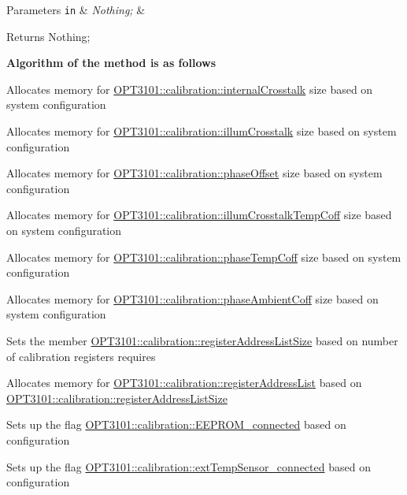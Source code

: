 \begin{DoxyParams}[1]{Parameters}
\mbox{\tt in}  & {\em Nothing;} & \\
\hline
\end{DoxyParams}
\begin{DoxyReturn}{Returns}
Nothing; 
\end{DoxyReturn}
{\bfseries Algorithm of the method is as follows}
\begin{DoxyItemize}
\item Allocates memory for \mbox{\hyperlink{class_o_p_t3101_1_1calibration_af63306e99b538aba754daa0d9f0c37a9}{O\+P\+T3101\+::calibration\+::internal\+Crosstalk}} size based on system configuration
\item Allocates memory for \mbox{\hyperlink{class_o_p_t3101_1_1calibration_a0aebed125263addca8bd8c809aad26f0}{O\+P\+T3101\+::calibration\+::illum\+Crosstalk}} size based on system configuration
\item Allocates memory for \mbox{\hyperlink{class_o_p_t3101_1_1calibration_abd318f8905f1e1834c3b21910a91c6a8}{O\+P\+T3101\+::calibration\+::phase\+Offset}} size based on system configuration
\item Allocates memory for \mbox{\hyperlink{class_o_p_t3101_1_1calibration_a5c5c221a8ff9285838315b9242d4d777}{O\+P\+T3101\+::calibration\+::illum\+Crosstalk\+Temp\+Coff}} size based on system configuration
\item Allocates memory for \mbox{\hyperlink{class_o_p_t3101_1_1calibration_a15ab9d61ee871815d12cb52c8cd8be55}{O\+P\+T3101\+::calibration\+::phase\+Temp\+Coff}} size based on system configuration
\item Allocates memory for \mbox{\hyperlink{class_o_p_t3101_1_1calibration_a6b2447d419a5f3544b648aaa618288a9}{O\+P\+T3101\+::calibration\+::phase\+Ambient\+Coff}} size based on system configuration
\item Sets the member \mbox{\hyperlink{class_o_p_t3101_1_1calibration_af17ddf5a6cc9919a1bfebde92e0d314f}{O\+P\+T3101\+::calibration\+::register\+Address\+List\+Size}} based on number of calibration registers requires
\item Allocates memory for \mbox{\hyperlink{class_o_p_t3101_1_1calibration_a590e645bfaf87fa8145f80b35dfa3b44}{O\+P\+T3101\+::calibration\+::register\+Address\+List}} based on \mbox{\hyperlink{class_o_p_t3101_1_1calibration_af17ddf5a6cc9919a1bfebde92e0d314f}{O\+P\+T3101\+::calibration\+::register\+Address\+List\+Size}}
\item Sets up the flag \mbox{\hyperlink{class_o_p_t3101_1_1calibration_a5a8e3d0fc96ea3319d10585cb073da35}{O\+P\+T3101\+::calibration\+::\+E\+E\+P\+R\+O\+M\+\_\+connected}} based on configuration
\item Sets up the flag \mbox{\hyperlink{class_o_p_t3101_1_1calibration_a937b08e4daf706842ae8e64eed4065bc}{O\+P\+T3101\+::calibration\+::ext\+Temp\+Sensor\+\_\+connected}} based on configuration 
\end{DoxyItemize}\mbox{\label{class_o_p_t3101_1_1calibration_a0d17887ea1f493ce825311164f6791dc}} 
